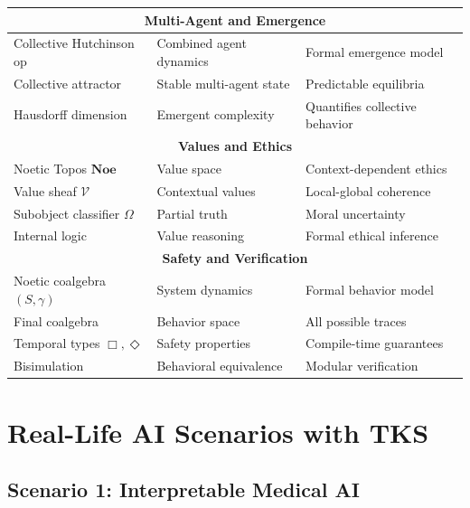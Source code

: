 \documentclass[11pt,twoside]{article}
\theoremstyle{definition}
\theoremstyle{plain}
\theoremstyle{remark}
\newcommand{\NoeticTopos}{\mathbf{Noe}}
\begin{document}
\begin{center}
\begin{tabularx}{\textwidth}{|l|X|X|}
\hline
\hline
\multicolumn{3}{|c|}{\textbf{Multi-Agent and Emergence}} \\
\hline
Collective Hutchinson op & Combined agent dynamics & Formal emergence model \\
\hline
Collective attractor & Stable multi-agent state & Predictable equilibria \\
\hline
Hausdorff dimension & Emergent complexity & Quantifies collective behavior \\
\hline
\hline
\multicolumn{3}{|c|}{\textbf{Values and Ethics}} \\
\hline
Noetic Topos $\NoeticTopos$ & Value space & Context-dependent ethics \\
\hline
Value sheaf $\mathcal{V}$ & Contextual values & Local-global coherence \\
\hline
Subobject classifier $\Omega$ & Partial truth & Moral uncertainty \\
\hline
Internal logic & Value reasoning & Formal ethical inference \\
\hline
\hline
\multicolumn{3}{|c|}{\textbf{Safety and Verification}} \\
\hline
Noetic coalgebra $(S, \gamma)$ & System dynamics & Formal behavior model \\
\hline
Final coalgebra & Behavior space & All possible traces \\
\hline
Temporal types $\Box, \Diamond$ & Safety properties & Compile-time guarantees \\
\hline
Bisimulation & Behavioral equivalence & Modular verification \\
\hline
\end{tabularx}
\end{center}

\section{Real-Life AI Scenarios with TKS}
\label{sec:scenarios}

\subsection{Scenario 1: Interpretable Medical AI}
\end{document}
